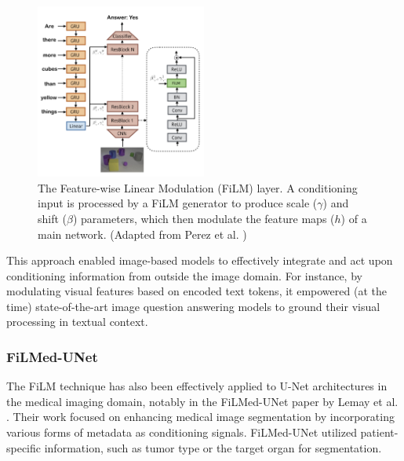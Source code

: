 \begin{figure}[h]
  \centering
  \includegraphics[width=0.5\textwidth]{images/related-work/film.png}
  \caption{The Feature-wise Linear Modulation (FiLM) layer. A conditioning input is processed by a FiLM generator to produce scale ($\gamma$) and shift ($\beta$) parameters, which then modulate the feature maps ($h$) of a main network. (Adapted from Perez et al. \cite{film})}
  \label{fig:film-layer}
\end{figure}

This approach enabled image-based models to effectively integrate and act upon conditioning information from outside the image domain. For instance, by modulating visual features based on encoded text tokens, it empowered (at the time) state-of-the-art image question answering models to ground their visual processing in textual context.

\subsubsection{FiLMed-UNet}
The FiLM technique has also been effectively applied to U-Net architectures in the medical imaging domain, notably in the FiLMed-UNet paper by Lemay et al. \cite{filmedunet}. Their work focused on enhancing medical image segmentation by incorporating various forms of metadata as conditioning signals. FiLMed-UNet utilized patient-specific information, such as tumor type or the target organ for segmentation.

